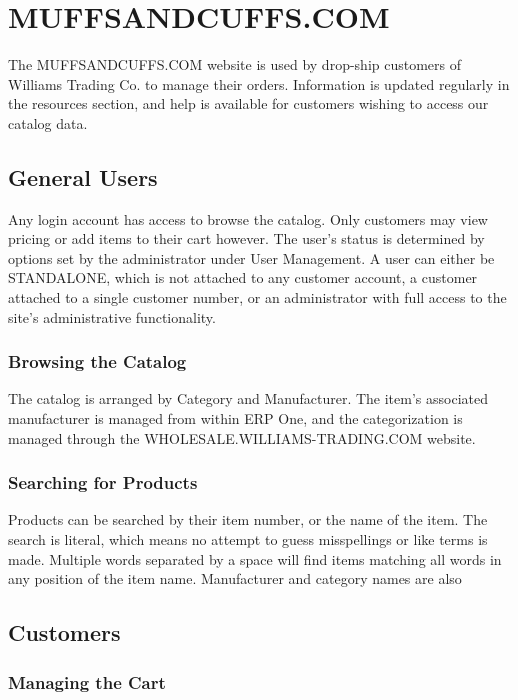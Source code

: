 \section{MUFFSANDCUFFS.COM}

The MUFFSANDCUFFS.COM website is used by drop-ship customers of Williams Trading Co. to manage their orders. Information is updated regularly in the resources section, and help is available for customers wishing to access our catalog data.

\subsection{General Users}

Any login account has access to browse the catalog. Only customers may view pricing or add items to their cart however. The user's status is determined by options set by the administrator under User Management. A user can either be STANDALONE, which is not attached to any customer account, a customer attached to a single customer number, or an administrator with full access to the site's administrative functionality.

\subsubsection{Browsing the Catalog}

The catalog is arranged by Category and Manufacturer. The item's associated manufacturer is managed from within ERP One, and the categorization is managed through the WHOLESALE.WILLIAMS-TRADING.COM website.

\subsubsection{Searching for Products}

Products can be searched by their item number, or the name of the item. The search is literal, which means no attempt to guess misspellings or like terms is made. Multiple words separated by a space will find items matching all words in any position of the item name. Manufacturer and category names are also 

\subsection{Customers}

\subsubsection{Managing the Cart}

